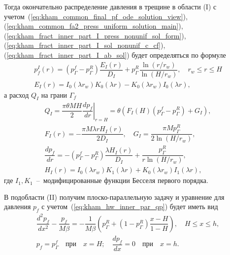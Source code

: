 \documentclass{article}
\newcommand{\mysub}[1]{%
  \par\vspace{0.5em}\noindent{\normalsize\underline{#1}}\par\vspace{0.5em}%
}
\begin{document}
Тогда окончательно распределение давления в трещине в области (I) с учетом~(\ref{eq:kham_common_final_pf_ode_solution_view}),
(\ref{eq:kham_common_fa2_press_uniform_solution_main}), (\ref{eq:kham_fract_inner_part_I_press_nonunif_sol_form}),
(\ref{eq:kham_fract_inner_part_I_sol_nonunif_c_cf}),
(\ref{eq:kham_fract_inner_part_I_ab_sol}) будет определяться по формуле
\begin{equation}
	\displaystyle
	\begin{gathered}
		p_f^{I}\left(r\right) = \left(p^f_{\Gamma} - p^R_{\Gamma}\right)
		\dfrac{E_I\left(r\right)}{D_I}
		+ p^R_{\Gamma} \dfrac{\ln\left(r/r_w\right)}{\ln{\left(H/r_w\right)}}, \quad
		r_w \leq r \leq H \\[6pt]
		E_I\left(r\right) = I_0\left(\lambda r_w\right)K_0\left(\lambda r\right) - K_0\left(\lambda r_w\right)I_0\left(\lambda r\right),
	\end{gathered}
	\label{eq:kham_fract_inner_part_I_final_pf}
\end{equation}
а расход $Q_I$ на грани $\Gamma_f$
\begin{equation}
	\displaystyle
	\begin{gathered}
		Q_I = \dfrac{\pi \theta M H}{2} \left. \dfrac{d p_f}{d r}\right|_{r=H} =
		\theta \left(    F_I\left(H\right) \left(p^f_{\Gamma} - p^R_{\Gamma}\right) + G_I \right) , \\[8pt]
		F_I\left(r\right) = - \dfrac{\pi M \lambda r H_I\left(r\right)}{2 D_I}, \quad
		G_I = \dfrac{\pi M p^R_{\Gamma}}{2 \ln{\left(H/r_w\right)}},  \\[8pt]
		\dfrac{d p_f}{d r} = - \left(p^f_{\Gamma} - p^R_{\Gamma}\right)
		\dfrac{\lambda H_I\left(r\right)}{D_I} +
		\dfrac{p^R_{\Gamma}}{r \ln{\left(H/r_w\right)}}, \\[8pt]
		H_I\left(r\right) =
		I_0\left(\lambda r_w\right)K_1\left(\lambda r\right) +
		K_0\left(\lambda r_w\right)I_1\left(\lambda r\right),
	\end{gathered}
	\label{eq:kham_hw_inner_part_I_Q}
\end{equation}
где $I_1, K_1$~--~модифицированные функции Бесселя первого порядка.

\mysub{Подобласть (II) $H \leq x \leq h$}
В подобласти (II) получим плоско-параллельную задачу и уравнение для давления $p_f$ с
учетом~(\ref{eq:kham_hw_inner_par_qp}) будет иметь вид
\begin{equation}
	\displaystyle
	\begin{gathered}
		\dfrac{d^2 p_f}{dx^2}-\dfrac{p_f}{M \beta}=-\dfrac{1}{M \beta}\left(p^R_{\Gamma} + (1 - p^R_{\Gamma})\dfrac{x - H}{1-H}\right),
		\quad H \leq x \leq h, \\
		p_f = p^f_{\Gamma}  \quad \text{при} \quad x = H; \quad \dfrac{d p_f}{d x} = 0 \quad \text{при} \quad x = h.
	\end{gathered}
	\label{eq:kham_hw_inner_part_II_pf_1d_equation}
\end{equation}
\end{document}
